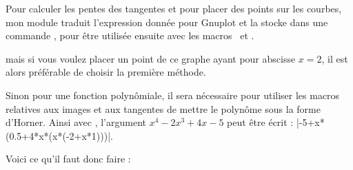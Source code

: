  Pour calculer les pentes des tangentes et pour placer des points sur les courbes, mon module traduit l'expression donnée pour Gnuplot et la stocke dans une commande , pour être utilisée ensuite avec les macros \ et .
% 

mais si vous voulez placer un point de ce graphe ayant pour abscisse $x=2$, il est alors préférable de choisir la première méthode.

Sinon pour une fonction polynômiale, il sera nécessaire pour utiliser les macros relatives aux images et aux tangentes de mettre le polynôme sous la forme d'Horner.
Ainsi avec , l'argument $x^4-2x^3+4x-5$ peut être écrit : |-5+x*(0.5+4*x*(x*(-2+x*1)))|.

Voici ce qu'il faut donc faire :

\begin{center}
\begin{tkzexample}[]
\end{tkzexample}
\end{center} 

\endinput

